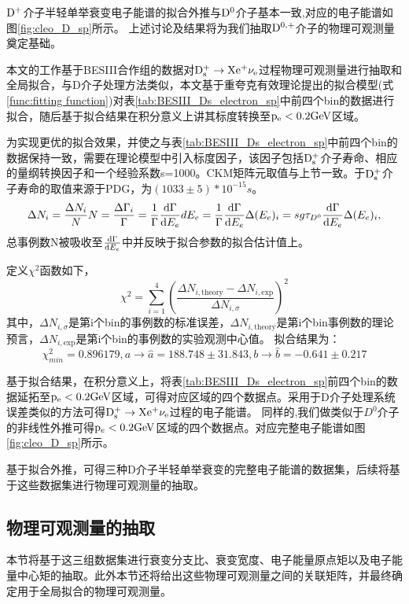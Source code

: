     $\mathrm{D^{+}}$介子半轻单举衰变电子能谱的拟合外推与$\mathrm{D^{0}}$介子基本一致,对应的电子能谱如图\ref{fig:cleo_D_sp}所示。
    上述讨论及结果将为我们抽取$\mathrm{D^{0,+}}$介子的物理可观测量奠定基础。

本文的工作基于BESIII合作组的数据对$\mathrm{D_s^+\to X e^+\nu_e}$过程物理可观测量进行抽取和全局拟合，与D介子处理方法类似，本文基于重夸克有效理论提出的拟合模型(式\eqref{func:fitting function})对表\ref{tab:BESIII_Ds_electron_sp}中前四个bin的数据进行拟合，随后基于拟合结果在积分意义上讲其标度转换至$\mathrm{p_{e}< 0.2\mathrm{GeV}}$区域。

为实现更优的拟合效果，并使之与表\ref{tab:BESIII_Ds_electron_sp}中前四个bin的数据保持一致，需要在理论模型中引入标度因子，该因子包括$\mathrm{D_s^+}$介子寿命、相应的量纲转换因子和一个经验系数s=1000。CKM矩阵元取值与上节一致。于$\mathrm{D_s^+}$介子寿命的取值来源于PDG，为$(1033\pm 5)*10^{-15}s$。
\begin{equation}
    \Delta N_{i}=\frac{\Delta N_{i}}{N} N= \frac{\Delta \Gamma_{i}}{\Gamma}=\frac{1}{\Gamma} \frac{\mathrm{d}\Gamma}{\mathrm{d}E_{e}}d E_{e}=\frac{1}{\Gamma} \frac{\mathrm{d}\Gamma}{\mathrm{d}E_{e}}\Delta (E_e)_{i}=s g\tau_{D^{0}}\frac{\mathrm{d}\Gamma}{\mathrm{d}E_{e}}\Delta (E_e)_{i}, 
\end{equation}
总事例数N被吸收至$\frac{\mathrm{d}\Gamma}{\mathrm{d}E_{e}}$中并反映于拟合参数的拟合估计值上。

定义$\chi^{2}$函数如下，
\begin{equation}
    \chi^{2}=\sum_{i=1}^{4}(\frac{\Delta N_{i,\text{theory}}-\Delta N_{i,\text{exp}}}{\Delta N_{i,\sigma}})^2
\end{equation}
其中，$\Delta N_{i,\sigma}$是第i个bin的事例数的标准误差，$\Delta N_{i,\text{theory}}$是第i个bin事例数的理论预言，$\Delta N_{i,\text{exp}}$是第i个bin的事例数的实验观测中心值。
拟合结果为：
$$\chi^{2}_{min}=0.896179, a \rightarrow \hat{a}=188.748\pm 31.843, b \rightarrow \hat{b}=-0.641\pm 0.217$$

基于拟合结果，在积分意义上，将表\ref{tab:BESIII_Ds_electron_sp}前四个bin的数据延拓至$\mathrm{p_e<0.2\mathrm{GeV}}$区域，可得对应区域的四个数据点。采用于D介子处理系统误差类似的方法可得$\mathrm{D_s^+\to X e^+\nu_e}$过程的电子能谱。
同样的,我们做类似于$D^{0}$介子的非线性外推可得$\mathrm{p}_{e}<0.2\mathrm{GeV}$区域的四个数据点。对应完整电子能谱如图\ref{fig:cleo_D_sp}所示。

基于拟合外推，可得三种D介子半轻单举衰变的完整电子能谱的数据集，后续将基于这些数据集进行物理可观测量的抽取。
\newpage
\subsection{物理可观测量的抽取}
本节将基于这三组数据集进行衰变分支比、衰变宽度、电子能量原点矩以及电子能量中心矩的抽取。此外本节还将给出这些物理可观测量之间的关联矩阵，并最终确定用于全局拟合的物理可观测量。
